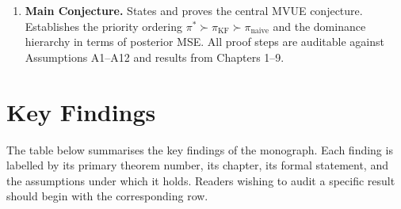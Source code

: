 \documentclass[12pt,openany]{book}
\newcommand{\E}{\mathbb{E}}
\numberwithin{equation}{chapter}
\theoremstyle{plain}
\theoremstyle{definition}
\theoremstyle{remark}
\begin{document}
\begin{enumerate}[label=\textbf{Ch.~\arabic*.}, leftmargin=3.8em,
                  itemsep=5pt, parsep=0pt, topsep=4pt]
\begin{align*}
          J(\pi) \;=\; -\,\E\bigl[\|\mathbf{S}_t - \hat{\mathbf{S}}_t\|^2\bigr]
        \end{align*}
        between the composite risk-adjusted objective $J$ and the
        negative posterior MSE.  Derives the information filter
        dual and the Cram\'{e}r--Rao lower bound for the
        composite policy $\pi^*$.
  \item \textbf{Main Conjecture.}
        States and proves the central MVUE conjecture.
        Establishes the priority ordering
        $\pi^*\succ\pi_{\mathrm{KF}}\succ\pi_{\mathrm{naive}}$
        and the dominance hierarchy in terms of posterior MSE.
        All proof steps are auditable against Assumptions A1--A12
        and results from Chapters 1--9.
\end{enumerate}

\section*{Key Findings}

\noindent
The table below summarises the key findings of the monograph.
Each finding is labelled by its primary theorem number, its
chapter, its formal statement, and the assumptions under which
it holds.  Readers wishing to audit a specific result should
begin with the corresponding row.
\end{document}
